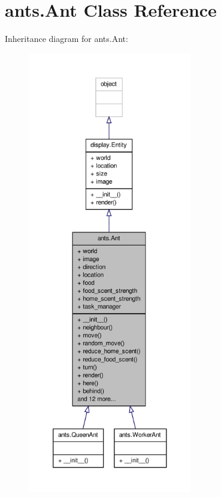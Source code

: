 \hypertarget{classants_1_1Ant}{\section{ants.\+Ant Class Reference}
\label{classants_1_1Ant}
}


Inheritance diagram for ants.\+Ant\+:
\nopagebreak
\begin{figure}[H]
\begin{center}
\leavevmode
\includegraphics[height=550pt]{classants_1_1Ant__inherit__graph}
\end{center}
\end{figure}


